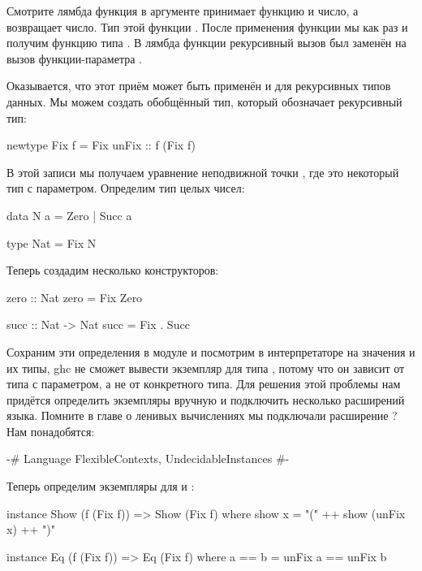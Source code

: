 Смотрите лямбда функция в аргументе  принимает функцию и число,
а возвращает число. Тип этой функции .
После применения функции  мы как раз и получим функцию типа
. В лямбда функции рекурсивный вызов был заменён на вызов
функции-параметра .

Оказывается, что этот приём может быть применён и для рекурсивных типов
данных. Мы можем создать обобщённый тип, который обозначает рекурсивный
тип:


\begin{code}
newtype Fix f = Fix { unFix :: f (Fix f) }
\end{code}

В этой записи мы получаем уравнение неподвижной точки
, где  это некоторый тип с параметром.
Определим тип целых чисел:


\begin{code}
data N a = Zero | Succ a

type Nat = Fix N
\end{code}

Теперь создадим несколько конструкторов:


\begin{code}
zero :: Nat
zero = Fix Zero

succ :: Nat -> Nat
succ = Fix . Succ
\end{code}

Сохраним эти определения в модуле  и посмотрим в
интерпретаторе на значения и их типы, ghc не сможет вывести экземпляр
 для типа , потому что он зависит от типа с параметром,
а не от конкретного типа. Для решения этой проблемы нам придётся
определить экземпляры вручную и подключить несколько расширений языка.
Помните в главе о ленивых вычислениях мы подключали расширение
? Нам понадобятся:


\begin{code}
{-# Language FlexibleContexts, UndecidableInstances #-}
\end{code}

Теперь определим экземпляры для  и :


\begin{code}
instance Show (f (Fix f)) => Show (Fix f) where
    show x = "(" ++ show (unFix x) ++ ")"

instance Eq (f (Fix f)) => Eq (Fix f) where
    a == b = unFix a == unFix b
\end{code}


